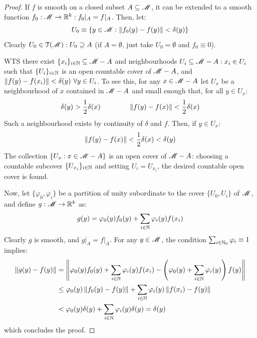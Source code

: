 \begin{proofbox}
  \begin{proof}
    If $ f $ is smooth on a closed subset $ A \subseteq \mathscr{M} $, it can be extended to a smooth function $ f_0 : \mathscr{M} \rightarrow \mathbb{R}^k : f_0 \vert_A = f \vert_A $. Then, let:
    \begin{equation*}
      U_0 \equiv \{y \in \mathscr{M} : \left\lVert f_0(y) - f(y)\right\rVert < \delta(y)\}
    \end{equation*}
    Clearly $ U_0 \in \EuScript{T}(\mathscr{M}) : U_0 \supseteq A $ (if $ A = \emptyset $, just take $ U_0 = \emptyset $ and $ f_0 \equiv 0 $).

    WTS there exist $ \{x_i\}_{i \in \mathbb{N}} \subseteq \mathscr{M} - A $ and neighbourhoods $ U_i \subseteq \mathscr{M} - A : x_i \in U_i $ such that $ \{U_i\}_{i \in \mathbb{N}} $ is an open countable cover of $ \mathscr{M} - A $, and $ \left\lVert f(y) - f(x_i)\right\rVert < \delta(y) \,\,\forall y \in U_i $. To see this, for any $ x \in \mathscr{M} - A $ let $ U_x $ be a neighbourhood of $ x $ contained in $ \mathscr{M} - A $ and small enough that, for all $ y \in U_x $:
    \begin{equation*}
      \delta(y) > \frac{1}{2} \delta(x)
      \qquad \qquad
      \left\lVert f(y) - f(x)\right\rVert < \frac{1}{2} \delta(x)
    \end{equation*}
    Such a neighbourhood exists by continuity of $ \delta $ and $ f $. Then, if $ y \in U_x $:
    \begin{equation*}
      \left\lVert f(y) - f(x)\right\rVert < \frac{1}{2} \delta(x) < \delta(y)
    \end{equation*}
    The collection $ \{U_x : x \in \mathscr{M} - A\} $ is an open cover of $ \mathscr{M} - A $: choosing a countable subcover $ \{U_{x_i}\}_{i \in \mathbb{N}} $ and setting $ U_i = U_{x_i} $, the desired countable open cover is found.

    Now, let $ \{\varphi_0 , \varphi_i\} $ be a partition of unity subordinate to the cover $ \{U_0 , U_i\} $ of $ \mathscr{M} $, and define $ g : \mathscr{M} \rightarrow \mathbb{R}^k $ as:
    \begin{equation*}
      g(y) = \varphi_0(y) f_0(y) + \sum_{i \in \mathbb{N}} \varphi_i(y) f(x_i)
    \end{equation*}
    Clearly $ g $ is smooth, and $ g \vert_A = f \vert_A $. For any $ y \in \mathscr{M} $, the condition $ \sum_{i \in \mathbb{N}_0} \varphi_i \equiv 1 $ implies:
    \begin{equation*}
      \begin{split}
        \left\lVert g(y) - f(y)\right\rVert
        & = \left\lVert\varphi_0(y) f_0(y) + \sum_{i \in \mathbb{N}} \varphi_i(y) f(x_i) - \left( \varphi_0(y) + \sum_{i \in \mathbb{N}} \varphi_i(y) \right) f(y)\right\rVert \\
        & \leq \varphi_0(y) \left\lVert f_0(y) - f(y)\right\rVert + \sum_{i \in \mathbb{N}} \varphi_i(y) \left\lVert f(x_i) - f(y)\right\rVert \\
        & < \varphi_0(y) \delta(y) + \sum_{i \in \mathbb{N}} \varphi_i(y) \delta(y) = \delta(y)
      \end{split}
    \end{equation*}
    which concludes the proof.
  \end{proof}
\end{proofbox}

